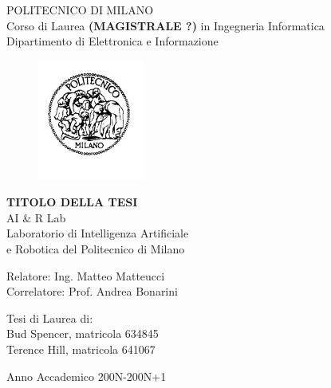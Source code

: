 \thispagestyle{empty}
\vspace*{-1.5cm} \bfseries{
\begin{center}
  \large
  POLITECNICO DI MILANO\\
  \normalsize
  Corso di Laurea \textbf{(MAGISTRALE ?)} in Ingegneria Informatica\\
  Dipartimento di Elettronica e Informazione\\
  \begin{figure}[htbp]
    \begin{center}
      \includegraphics[width=3.5cm]{./pictures/logopm}
    \end{center}
  \end{figure}
  \vspace*{0.3cm} \LARGE



  \textbf{TITOLO DELLA TESI}\\



  \vspace*{.75truecm} \large
  AI \& R Lab \\
  Laboratorio di Intelligenza Artificiale \\
  e Robotica del Politecnico di Milano
\end{center}
\vspace*{3.0cm} \large
\begin{flushleft}


  Relatore: Ing. Matteo Matteucci \\
  Correlatore: Prof. Andrea Bonarini 

\end{flushleft}
\vspace*{1.0cm}
\begin{flushright}


  Tesi di Laurea di:\\ Bud Spencer, matricola 634845 \\ 
		       Terence Hill, matricola 641067 \\


\end{flushright}
\vspace*{0.5cm}
\begin{center}



  Anno Accademico 200N-200N+1
\end{center} \clearpage
}
